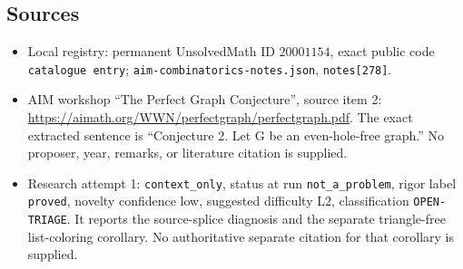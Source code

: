 \documentclass[11pt]{article}
\begin{document}
\subsection{Sources}
\begin{itemize}
\item Local registry: permanent UnsolvedMath ID \(20001154\), exact public code \texttt{catalogue entry}; \texttt{aim-combinatorics-notes.json}, \texttt{notes[278]}.
\item AIM workshop ``The Perfect Graph Conjecture'', source item 2: \url{https://aimath.org/WWN/perfectgraph/perfectgraph.pdf}. The exact extracted sentence is ``Conjecture 2. Let G be an even-hole-free graph.'' No proposer, year, remarks, or literature citation is supplied.
\item Research attempt 1: \texttt{context\_only}, status at run \texttt{not\_a\_problem}, rigor label \texttt{proved}, novelty confidence low, suggested difficulty L2, classification \texttt{OPEN-TRIAGE}. It reports the source-splice diagnosis and the separate triangle-free list-coloring corollary. No authoritative separate citation for that corollary is supplied.
\end{itemize}
\end{document}
